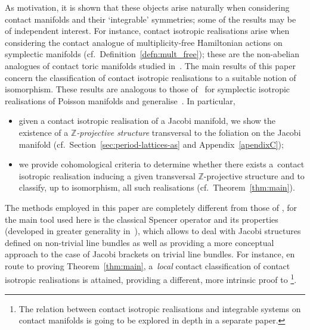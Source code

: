 \documentclass[pdftex]{sigma}
\numberwithin{equation}{section}
\newcommand{\ZZ}{\mathbb{Z}}
\begin{document}
As motivation, it is shown that these objects arise naturally when considering contact ma\-ni\-folds and their `integrable' symmetries; some of the results may be of independent in\-te\-rest. For instance, contact isotropic realisations arise when considering the contact analogue of multiplicity-free Hamiltonian actions on symplectic manifolds (cf.\ Def\/inition~\ref{defn:mult_free}); these are the non-abelian analogues of contact toric manifolds studied in~\cite{lerman_contact_toric,wolbert}. The main results of this paper concern the classif\/ication of contact isotropic realisations to a suitable notion of isomorphism. These results are analogous to those of~\cite{dd} for symplectic isotropic realisations of Poisson manifolds and generalise~\cite{Banyaga,jovanovic}. In particular,
\begin{itemize}\itemsep=0pt
\item given a contact isotropic realisation of a Jacobi manifold, we show the existence of a {\it $\ZZ$-projective structure} transversal to the foliation on the Jacobi manifold (cf.\ Section~\ref{sec:period-lattices-as} and Appendix~\ref{apendixC});
\item we provide cohomological criteria to determine whether there exists a~contact isotropic realisation inducing a given transversal $\ZZ$-projective structure and to classify, up to isomorphism, all such realisations (cf.\ Theorem~\ref{thm:main}).
\end{itemize}

The methods employed in this paper are completely dif\/ferent from those of \cite{Banyaga,dd,jovanovic,lerman_contact_toric,wolbert}, for the main tool used here is the classical Spencer operator and its properties (developed in greater generality in~\cite{Maria}), which allows to deal with Jacobi structures def\/ined on non-trivial line bundles as well as providing a more conceptual approach to the case of Jacobi brackets on trivial line bundles. For instance, en route to proving Theorem~\ref{thm:main}, a~{\it local} contact classif\/ication of contact isotropic realisations is attained, providing a dif\/ferent, more intrinsic proof to \cite[Theorem~4]{jovanovic}\footnote{The relation between contact isotropic realisations and integrable systems on contact manifolds is going to be explored in depth in a separate paper.}.
\end{document}
